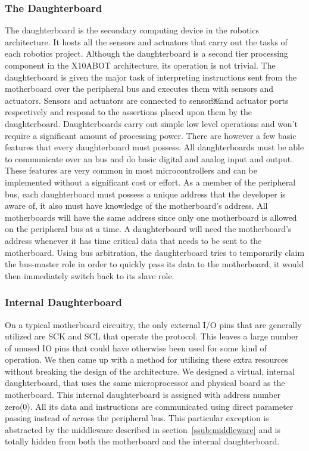 	\subsubsection{The Daughterboard} %
	\label{ssub:the_daughterboard}
	The daughterboard is the secondary computing device in the \xten robotics architecture. It hosts all the sensors and actuators that carry out the tasks of each robotics project. Although the daughterboard is a second tier processing component in the X10ABOT architecture, its operation is not trivial. The daughterboard is given the major task of interpreting instructions sent from the motherboard over the peripheral bus and executes them with sensors and actuators. Sensors and actuators are connected to sensor￼and actuator ports respectively and respond to the assertions placed upon them by the daughterboard. Daughterboards carry out simple low level operations and won't require a significant amount of processing power. There are however a few basic features that every daughterboard must possess. All daughterboards must be able to communicate over an \iic bus and do basic digital and analog input and output. These features are very common in most microcontrollers and can be implemented without a significant cost or effort.
	As a member of the peripheral bus, each daughterboard must possess a unique address that the developer is aware of, it also must have knowledge of the motherboard's address. All motherboards will have the same address since only one motherboard is allowed on the peripheral bus at a time. A daughterboard will need the motherboard's address whenever it has time critical data that needs to be sent to the motherboard. Using bus arbitration, the daughterboard tries to temporarily claim the bus-master role in order to quickly pass its data to the motherboard, it would then immediately switch back to its slave role.
	\subsubsection{Internal Daughterboard} %
	\label{ssub:internal_daughterboard}
	
	On a typical motherboard circuitry, the only external I/O pins that are generally utilized are SCK and SCL that operate the \iic protocol. This leaves a large number of unused IO pins that could have otherwise been used for some kind of operation. We then came up with a method for utilising these extra resources without breaking the design of the architecture. We designed a virtual, internal daughterboard, that uses the same microprocessor and physical board as the motherboard. This internal daughterboard is assigned with address number zero(0). All its data and instructions are communicated using direct parameter passing instead of across the peripheral bus. This particular exception is abstracted by the middleware described in section~\ref{ssub:middleware} and is totally hidden from both the motherboard and the internal daughterboard.
	
